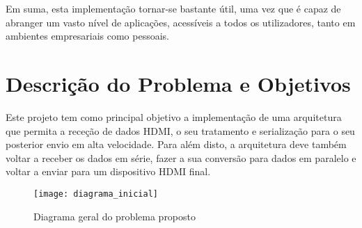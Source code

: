 Em suma, esta implementação tornar-se bastante útil, uma vez que é capaz de abranger um vasto nível de aplicações, acessíveis a todos os utilizadores, tanto em ambientes empresariais como pessoais.

%

\section{Descrição do Problema e Objetivos} \label{sec:descrição_objetivos}

Este projeto tem como principal objetivo a implementação de uma arquitetura que permita a receção de dados HDMI, o seu tratamento e serialização para o seu posterior envio em alta velocidade. Para além disto, a arquitetura deve também voltar a receber os dados em série, fazer a sua conversão para dados em paralelo e voltar a enviar para um dispositivo HDMI final.

\begin{figure}[h!]
	\begin{center}
		\leavevmode
		\texttt{[image: diagrama\_inicial]}
		\caption{Diagrama geral do problema proposto}
		\label{fig:diagrama_inicial}
	\end{center}
\end{figure}

